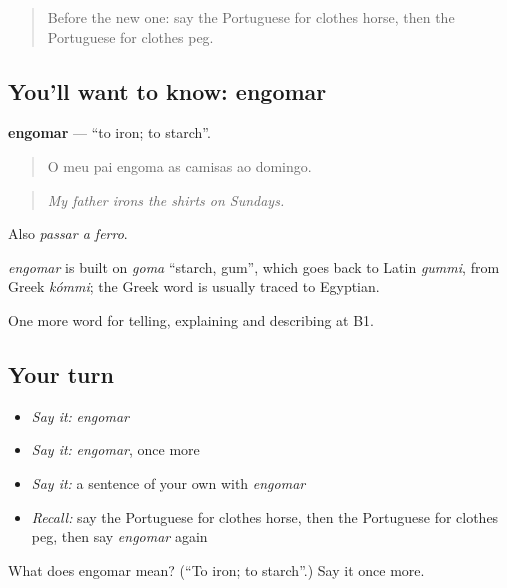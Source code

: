 \label{lesson:PT-C529-engomar}



\begin{quote}
Before the new one: say the Portuguese for clothes horse, then the Portuguese for clothes peg.
\end{quote}

\subsection*{You'll want to know: engomar}
\textbf{engomar} — \textquotedblleft{}to iron; to starch\textquotedblright{}.

\begin{quote}
O meu pai engoma as camisas ao domingo.
\end{quote}

\begin{quote}
\emph{My father irons the shirts on Sundays.}
\end{quote}

Also \emph{passar a ferro}.

\begin{cousinweb}
\emph{engomar} is built on \emph{goma} \textquotedblleft{}starch, gum\textquotedblright{}, which goes back to Latin \emph{gummi}, from Greek \emph{kómmi}; the Greek word is usually traced to Egyptian.
\end{cousinweb}

\begin{grammarlens}[title={What you've built}]
One more word for telling, explaining and describing at B1.
\end{grammarlens}

\subsection*{Your turn}
\begin{itemize}
\raggedright
  \item \emph{Say it:} \emph{engomar}
  \item \emph{Say it:} \emph{engomar}, once more
  \item \emph{Say it:} a sentence of your own with \emph{engomar}
  \item \emph{Recall:} say the Portuguese for clothes horse, then the Portuguese for clothes peg, then say \emph{engomar} again
\end{itemize}

\begin{tcolorbox}[breakable,colback=teal!4,colframe=teal!35!black,title={Before you move on}]
What does engomar mean? (\textquotedblleft{}To iron; to starch\textquotedblright{}.) Say it once more.
\end{tcolorbox}
